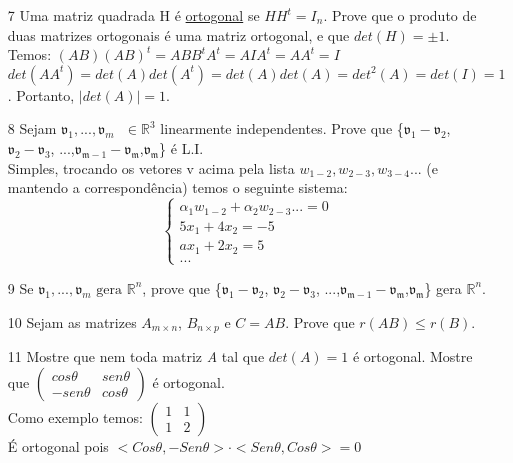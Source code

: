 \documentclass[a4paper]{article}
\begin{document}
\begin{itemize}
\item[7] Uma matriz quadrada H é \underline{ortogonal} se $HH^t=I_n$. Prove que o produto de duas matrizes ortogonais é uma matriz ortogonal, e que $det(H)=\pm 1$.
\\ \textcolor[rgb]{0,0,1}{
Temos: $(AB)(AB)^t=ABB^tA^t=AIA^t=AA^t=I$
\\$det(AA^t)=det(A)det(A^t)=det(A)det(A)=det^2(A)=det(I)=1$. Portanto, $|det(A)|=1$.
}

\item[8] Sejam $\mathfrak{v}_1,...,\mathfrak{v}_m\text{ }\in \mathbb{R}^3$ linearmente independentes. Prove que \{$\mathfrak{v_1-v_2}$,
$\mathfrak{v_2-v_3}$,
...,$\mathfrak{v_{m-1}-v_{m}}$,$\mathfrak{v_{m}}$\} é L.I.
\\ \textcolor[rgb]{0,0,1}{Simples, trocando os vetores v acima pela lista $w_{1-2},w_{2-3},w_{3-4}...$ (e mantendo a correspondência) temos o seguinte sistema:
$$
 \left\{
\begin{array}{llll}
\displaystyle \alpha_1w_{1-2}+\alpha_2w_{2-3} ...=0 \\
\displaystyle 5x_1+4x_2=-5 \\
\displaystyle ax_1+2x_2=5 \\
...
\end{array}
\right.
$$}

\item[9] Se $\mathfrak{v}_1,...,\mathfrak{v}_m\text{ gera } \mathbb{R}^n$, prove que \{$\mathfrak{v_1-v_2}$,
$\mathfrak{v_2-v_3}$,
...,$\mathfrak{v_{m-1}-v_{m}}$,$\mathfrak{v_{m}}$\} gera $\mathbb{R}^n$.

\item[10] Sejam as matrizes $A_{m\times n}$, $B_{n\times p}$ e $C=AB$. Prove que $r(AB)\leq r(B)$.

\item[11] Mostre que nem toda matriz \textit{A} tal que $det(A)=1$ é ortogonal. Mostre que $
\left(\begin{array}{rr}
cos\theta & sen\theta \\
-sen\theta & cos\theta
\end{array}\right)
$ é ortogonal.
\\ \textcolor[rgb]{0,0,1}{
Como exemplo temos:
$
\left(\begin{array}{rr}
1 & 1 \\
1 & 2
\end{array}\right)
$
\\É ortogonal pois $<Cos\theta,-Sen\theta>\cdot<Sen\theta,Cos\theta>=0$
}


\end{itemize}
\end{document}
